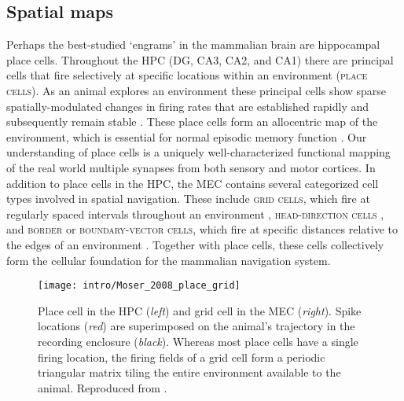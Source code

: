 \subsection{Spatial maps}
\label{sec:intro:memory:spatial_maps}
Perhaps the best-studied `engrams' in the mammalian brain are hippocampal place cells.
Throughout the \ac{HPC} (\ac{DG}, CA3, CA2, and CA1) there are principal cells that fire selectively at specific locations within an environment (\textsc{place cells}).
As an animal explores an environment these principal cells show sparse spatially-modulated changes in firing rates that are established rapidly and subsequently remain stable \citep{O'Keefe1971, Thompson1990, Frank2004}.
These place cells form an allocentric map of the environment, which is essential for normal episodic memory function \citep{Smith2006c, Nakazawa2004, Buzsaki2013}.
Our understanding of place cells is a uniquely well-characterized functional mapping of the real world multiple synapses from both sensory and motor cortices.
In addition to place cells in the \ac{HPC}, the \ac{MEC} contains several categorized cell types involved in spatial navigation.
These include \textsc{grid cells}, which fire at regularly spaced intervals throughout an environment \citep{Hafting2005, Moser2014a}, \textsc{head-direction cells} \citep{Taube2007}, and \textsc{border} or \textsc{boundary-vector cells}, which fire at specific distances relative to the edges of an environment \citep{Solstad2008}.
Together with place cells, these cells collectively form the cellular foundation for the mammalian navigation system.

\begin{figure}
	\centering
	\texttt{[image: intro/Moser\_2008\_place\_grid]}
	\caption[Place cell in the \acs{HPC} and grid cell in the \acs{MEC}]{Place cell in the \ac{HPC} (\textit{left}) and grid cell in the \ac{MEC} (\textit{right}).
	Spike locations (\textit{red}) are superimposed on the animal's trajectory in the recording enclosure (\textit{black}).
	Whereas most place cells have a single firing location, the firing fields of a grid cell form a periodic triangular matrix tiling the entire environment available to the animal.
	Reproduced from \citet{Moser2008}.}
	\label{fig:intro:memory:place_grid}
\end{figure}

